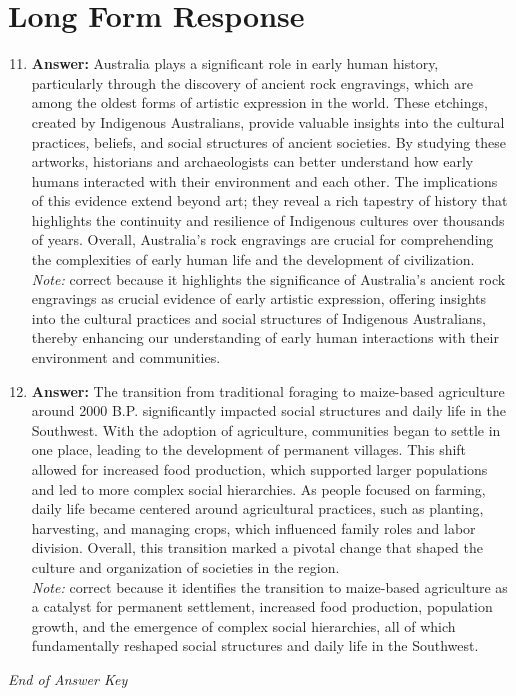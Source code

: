 \documentclass[12pt]{article}
\begin{document}
\section*{Long Form Response}
\begin{enumerate}[label=\arabic*.]
\setcounter{enumi}{10}
\item \textbf{Answer:} Australia plays a significant role in early human history, particularly through the discovery of ancient rock engravings, which are among the oldest forms of artistic expression in the world. These etchings, created by Indigenous Australians, provide valuable insights into the cultural practices, beliefs, and social structures of ancient societies. By studying these artworks, historians and archaeologists can better understand how early humans interacted with their environment and each other. The implications of this evidence extend beyond art; they reveal a rich tapestry of history that highlights the continuity and resilience of Indigenous cultures over thousands of years. Overall, Australia's rock engravings are crucial for comprehending the complexities of early human life and the development of civilization.
\\ \textit{Note:} correct because it highlights the significance of Australia's ancient rock engravings as crucial evidence of early artistic expression, offering insights into the cultural practices and social structures of Indigenous Australians, thereby enhancing our understanding of early human interactions with their environment and communities.
\item \textbf{Answer:} The transition from traditional foraging to maize-based agriculture around 2000 B.P. significantly impacted social structures and daily life in the Southwest. With the adoption of agriculture, communities began to settle in one place, leading to the development of permanent villages. This shift allowed for increased food production, which supported larger populations and led to more complex social hierarchies. As people focused on farming, daily life became centered around agricultural practices, such as planting, harvesting, and managing crops, which influenced family roles and labor division. Overall, this transition marked a pivotal change that shaped the culture and organization of societies in the region.
\\ \textit{Note:} correct because it identifies the transition to maize-based agriculture as a catalyst for permanent settlement, increased food production, population growth, and the emergence of complex social hierarchies, all of which fundamentally reshaped social structures and daily life in the Southwest.
\end{enumerate}

\vfill
\noindent\textit{End of Answer Key}
\end{document}
